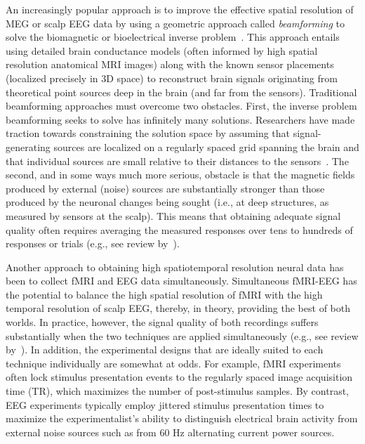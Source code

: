 \message{ !name(main.tex)}\documentclass[11pt]{article}
\begin{document}
An increasingly popular approach is to improve the effective spatial
resolution of MEG or scalp EEG data by using a geometric approach
called \textit{beamforming} to solve the biomagnetic or bioelectrical
inverse problem~\cite{Sarv87}.  This approach entails using detailed
brain conductance models (often informed by high spatial resolution
anatomical MRI images) along with the known sensor placements
(localized precisely in 3D space) to reconstruct brain signals
originating from theoretical point sources deep in the brain (and far
from the sensors).  Traditional beamforming approaches must overcome
two obstacles.  First, the inverse problem beamforming seeks to solve
has infinitely many solutions.  Researchers have made traction towards
constraining the solution space by assuming that signal-generating
sources are localized on a regularly spaced grid spanning the brain
and that individual sources are small relative to their distances to
the sensors~\cite{Snyd91, BailEtal01, HillEtal05}.  The second, and in
some ways much more serious, obstacle is that the magnetic fields
produced by external (noise) sources are substantially stronger than
those produced by the neuronal changes being sought (i.e., at deep
structures, as measured by sensors at the scalp).  This means that
obtaining adequate signal quality often requires averaging the
measured responses over tens to hundreds of responses or trials
(e.g., see review by~\cite{HillEtal05}).

Another approach to obtaining high spatiotemporal resolution
neural data has been to collect fMRI and EEG data simultaneously.
Simultaneous fMRI-EEG has the potential to balance the high spatial
resolution of fMRI with the high temporal resolution of scalp EEG,
thereby, in theory, providing the best of both worlds.  In practice,
however, the signal quality of both recordings suffers substantially
when the two techniques are applied simultaneously (e.g., see review
by~\cite{HustEtal12}).  In addition, the experimental designs that are
ideally suited to each technique individually are somewhat at odds.
For example, fMRI experiments often lock stimulus presentation
events to the regularly spaced image acquisition time (TR), which
maximizes the number of post-stimulus samples.  By contrast, EEG
experiments typically employ jittered stimulus presentation times to
maximize the experimentalist's ability to distinguish electrical brain
activity from external noise sources such as from 60 Hz alternating
current power sources.
\end{document}

